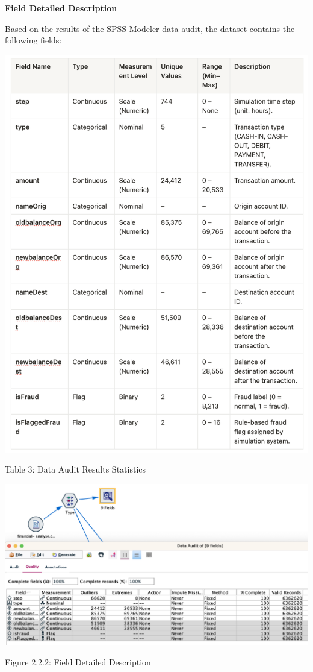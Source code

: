 \documentclass[sigplan,screen]{acmart}
\begin{document}
\textbf{Field Detailed Description}

Based on the results of the SPSS Modeler data audit, the dataset contains the following fields:
\vspace{0.3cm}

\begin{center}
\includegraphics[width=0.9\columnwidth]{table3.jpg}
\vspace{0.2cm}

Table 3: Data Audit Results Statistics
\end{center}

\vspace{0.3cm}

\begin{center}
\includegraphics[width=0.9\columnwidth]{2.2.2.png}
\vspace{0.2cm}

Figure 2.2.2: Field Detailed Description
\end{center}
\end{document}
